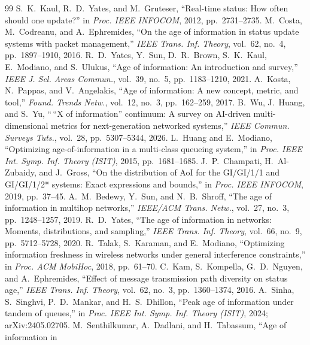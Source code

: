 \documentclass[twocolumn,3p,times,procedia]{elsarticle}
\begin{document}
\balance
\begin{thebibliography}{99}
S.~K.~Kaul, R.~D.~Yates, and M.~Gruteser, ``Real-time status: How often
should one update?'' in \emph{Proc. IEEE INFOCOM}, 2012, pp.~2731--2735.
M.~Costa, M.~Codreanu, and A.~Ephremides, ``On the age of information in
status update systems with packet management,'' \emph{IEEE Trans. Inf.
Theory}, vol.~62, no.~4, pp.~1897--1910, 2016.
R.~D.~Yates, Y.~Sun, D.~R.~Brown, S.~K.~Kaul, E.~Modiano, and S.~Ulukus,
``Age of information: An introduction and survey,'' \emph{IEEE J. Sel.
Areas Commun.}, vol.~39, no.~5, pp.~1183--1210, 2021.
A.~Kosta, N.~Pappas, and V.~Angelakis, ``Age of information: A new concept,
metric, and tool,'' \emph{Found. Trends Netw.}, vol.~12, no.~3,
pp.~162--259, 2017.
B.~Wu, J.~Huang, and S.~Yu, ``\,``X of information'' continuum: A survey on
AI-driven multi-dimensional metrics for next-generation networked
systems,'' \emph{IEEE Commun. Surveys Tuts.}, vol.~28, pp.~5307--5344,
2026.
L.~Huang and E.~Modiano, ``Optimizing age-of-information in a multi-class
queueing system,'' in \emph{Proc. IEEE Int. Symp. Inf. Theory (ISIT)},
2015, pp.~1681--1685.
J.~P.~Champati, H.~Al-Zubaidy, and J.~Gross, ``On the distribution of AoI
for the GI/GI/1/1 and GI/GI/1/2* systems: Exact expressions and bounds,''
in \emph{Proc. IEEE INFOCOM}, 2019, pp.~37--45.
A.~M.~Bedewy, Y.~Sun, and N.~B.~Shroff, ``The age of information in
multihop networks,'' \emph{IEEE/ACM Trans. Netw.}, vol.~27, no.~3,
pp.~1248--1257, 2019.
R.~D.~Yates, ``The age of information in networks: Moments, distributions,
and sampling,'' \emph{IEEE Trans. Inf. Theory}, vol.~66, no.~9,
pp.~5712--5728, 2020.
R.~Talak, S.~Karaman, and E.~Modiano, ``Optimizing information freshness in
wireless networks under general interference constraints,'' in \emph{Proc.
ACM MobiHoc}, 2018, pp.~61--70.
C.~Kam, S.~Kompella, G.~D.~Nguyen, and A.~Ephremides, ``Effect of message
transmission path diversity on status age,'' \emph{IEEE Trans. Inf.
Theory}, vol.~62, no.~3, pp.~1360--1374, 2016.
A.~Sinha, S.~Singhvi, P.~D.~Mankar, and H.~S.~Dhillon, ``Peak age of
information under tandem of queues,'' in \emph{Proc. IEEE Int. Symp. Inf.
Theory (ISIT)}, 2024; arXiv:2405.02705.
M.~Senthilkumar, A.~Dadlani, and H.~Tabassum, ``Age of information in

\end{thebibliography}
\end{document}
